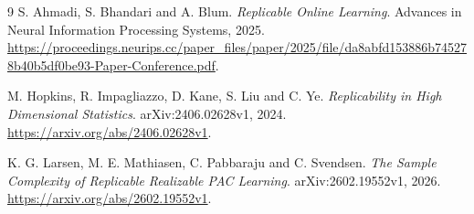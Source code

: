 \documentclass[11pt]{article}
\newcommand{\1}{\mathbf 1}
\begin{document}
\begin{thebibliography}{9}
S. Ahmadi, S. Bhandari and A. Blum.
\emph{Replicable Online Learning}.
Advances in Neural Information Processing Systems, 2025.
\url{https://proceedings.neurips.cc/paper_files/paper/2025/file/da8abfd153886b745278b40b5df0be93-Paper-Conference.pdf}.

M. Hopkins, R. Impagliazzo, D. Kane, S. Liu and C. Ye.
\emph{Replicability in High Dimensional Statistics}.
arXiv:2406.02628v1, 2024.
\url{https://arxiv.org/abs/2406.02628v1}.

K. G. Larsen, M. E. Mathiasen, C. Pabbaraju and C. Svendsen.
\emph{The Sample Complexity of Replicable Realizable PAC Learning}.
arXiv:2602.19552v1, 2026.
\url{https://arxiv.org/abs/2602.19552v1}.
\end{thebibliography}
\end{document}
